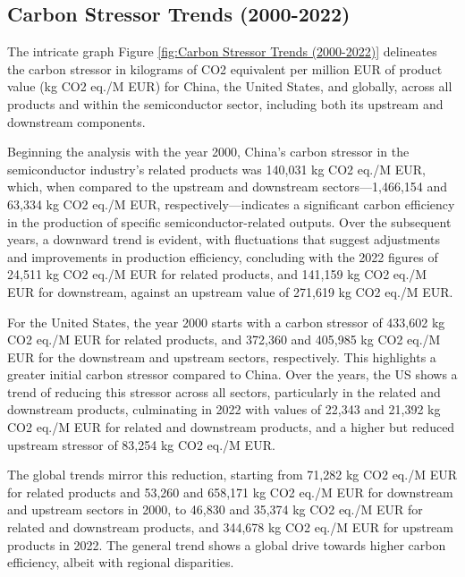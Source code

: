 \subsection{Carbon Stressor Trends (2000-2022)}
The intricate graph Figure \ref{fig:Carbon Stressor Trends (2000-2022)} delineates the carbon stressor in kilograms of CO2 equivalent per million EUR of product value (kg CO2 eq./M EUR) for China, the United States, and globally, across all products and within the semiconductor sector, including both its upstream and downstream components.

Beginning the analysis with the year 2000, China's carbon stressor in the semiconductor industry's related products was 140,031 kg CO2 eq./M EUR, which, when compared to the upstream and downstream sectors—1,466,154 and 63,334 kg CO2 eq./M EUR, respectively—indicates a significant carbon efficiency in the production of specific semiconductor-related outputs. Over the subsequent years, a downward trend is evident, with fluctuations that suggest adjustments and improvements in production efficiency, concluding with the 2022 figures of 24,511 kg CO2 eq./M EUR for related products, and 141,159 kg CO2 eq./M EUR for downstream, against an upstream value of 271,619 kg CO2 eq./M EUR.

For the United States, the year 2000 starts with a carbon stressor of 433,602 kg CO2 eq./M EUR for related products, and 372,360 and 405,985 kg CO2 eq./M EUR for the downstream and upstream sectors, respectively. This highlights a greater initial carbon stressor compared to China. Over the years, the US shows a trend of reducing this stressor across all sectors, particularly in the related and downstream products, culminating in 2022 with values of 22,343 and 21,392 kg CO2 eq./M EUR for related and downstream products, and a higher but reduced upstream stressor of 83,254 kg CO2 eq./M EUR.

The global trends mirror this reduction, starting from 71,282 kg CO2 eq./M EUR for related products and 53,260 and 658,171 kg CO2 eq./M EUR for downstream and upstream sectors in 2000, to 46,830 and 35,374 kg CO2 eq./M EUR for related and downstream products, and 344,678 kg CO2 eq./M EUR for upstream products in 2022. The general trend shows a global drive towards higher carbon efficiency, albeit with regional disparities.

